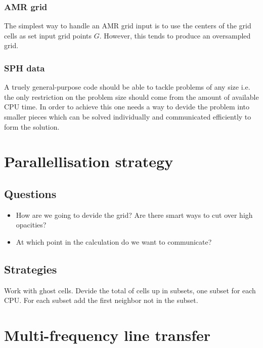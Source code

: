 \documentclass[]{article}
\begin{document}
\subsubsection{AMR grid}

The simplest way to handle an AMR grid input is to use the centers of the grid cells as set input grid points $G$. However, this tends to produce an oversampled grid.



\subsubsection{SPH data}

A truely general-purpose code should be able to tackle problems of any size i.e. the only restriction on the problem size should come from the amount of available CPU time.  In order to achieve this one needs a way to devide the problem into smaller pieces which can be solved individually and communicated efficiently to form the solution.


\section{Parallellisation strategy}


\subsection{Questions}

\begin{itemize}
\item How are we going to devide the grid? Are there smart ways to cut over high opacities?
\item At which point in the calculation do we want to communicate?
\end{itemize}

\subsection{Strategies}

Work with ghost cells. Devide the total of cells up in subsets, one subset for each CPU. For each subset add the first neighbor not in the subset.


\section{Multi-frequency line transfer}
\end{document}
